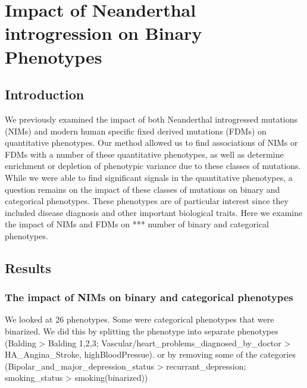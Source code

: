 \chapter{Impact of Neanderthal introgression on Binary Phenotypes}
\section{Introduction}
We previously examined the impact of both Neanderthal introgressed mutations (NIMs) and modern human specific fixed derived mutations (FDMs) on quantitative phenotypes. Our method allowed us to find associations of NIMs or FDMs with a number of these quantitative phenotypes, as well as determine enrichment or depletion of phenotypic variance due to these classes of mutations. While we were able to find significant signals in the quantitative phenotypes, a question remains on the impact of these classes of mutations on binary and categorical phenotypes. These phenotypes are of particular interest since they included disease diagnosis and other important biological traits. Here we examine the impact of NIMs and FDMs on *** number of binary and categorical phenotypes.

\section{Results}
\subsection{The impact of NIMs on binary and categorical phenotypes}

We looked at 26 phenotypes. Some were categorical phenotypes that were binarized. We did this by splitting the phenotype into separate phenotypes (Balding > Balding 1,2,3; Vascular/heart_problems_diagnosed_by_doctor > HA_Angina_Stroke, highBloodPressue). or by removing some of the categories (Bipolar_and_major_depression_status > recurrant_depression; smoking_status > smoking(binarized))


